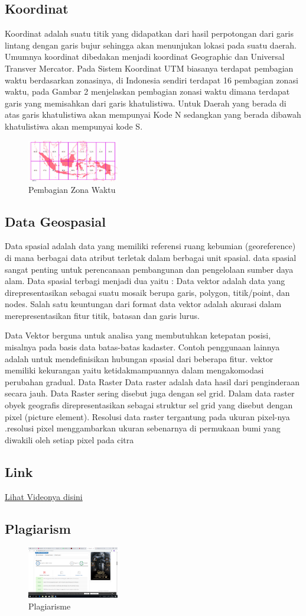 \subsection{Koordinat}
Koordinat adalah suatu titik yang didapatkan dari hasil perpotongan dari garis lintang dengan garis bujur sehingga akan menunjukan lokasi pada suatu daerah. Umumnya koordinat dibedakan menjadi koordinat Geographic dan Universal Transver Mercator.
Pada Sistem Koordinat UTM biasanya terdapat pembagian waktu berdasarkan zonasinya, di Indonesia sendiri terdapat 16 pembagian zonasi waktu, pada Gambar 2 menjelaskan pembagian zonasi waktu dimana terdapat garis yang memisahkan dari garis khatulistiwa. Untuk Daerah yang berada di atas garis khatulistiwa akan mempunyai Kode N sedangkan yang berada dibawah khatulistiwa akan mempunyai kode S.

\begin{figure}[H]
	\includegraphics[width=4cm]{figures/1174095/dzihan.png}
	\centering
	\caption{Pembagian Zona Waktu}
\end{figure}

\subsection{Data Geospasial}
Data spasial adalah data yang memiliki referensi ruang kebumian (georeference) di mana berbagai data atribut terletak dalam berbagai unit spasial. data spasial  sangat penting untuk perencanaan pembangunan dan pengelolaan sumber daya alam.
Data spasial terbagi menjadi dua yaitu :
Data vektor adalah data yang direpresentasikan sebagai suatu mosaik berupa garis, polygon, titik/point, dan nodes. Salah satu keuntungan dari format data vektor adalah akurasi dalam merepresentasikan fitur titik, batasan dan garis lurus.

Data Vektor berguna untuk analisa yang membutuhkan ketepatan posisi, misalnya pada basis data batas-batas kadaster. Contoh penggunaan lainnya adalah untuk mendefinisikan hubungan spasial dari beberapa fitur. vektor memiliki kekurangan yaitu ketidakmampuannya dalam mengakomodasi perubahan gradual.
	Data Raster
Data raster adalah data hasil dari penginderaan secara jauh. Data Raster sering disebut juga dengan sel grid. Dalam data raster obyek geografis direpresentasikan sebagai struktur sel grid yang disebut dengan pixel (picture element). Resolusi data raster tergantung pada ukuran pixel-nya .resolusi pixel menggambarkan ukuran sebenarnya di permukaan bumi yang diwakili oleh setiap pixel pada citra
\subsection{Link}
\href{https://youtu.be/KLmO0eBCJAQ}{Lihat Videonya disini}
\subsection{Plagiarism}
\begin{figure}[H]
	\includegraphics[width=4cm]{figures/1174095/plag.png}
	\centering
	\caption{Plagiarisme}
\end{figure}
